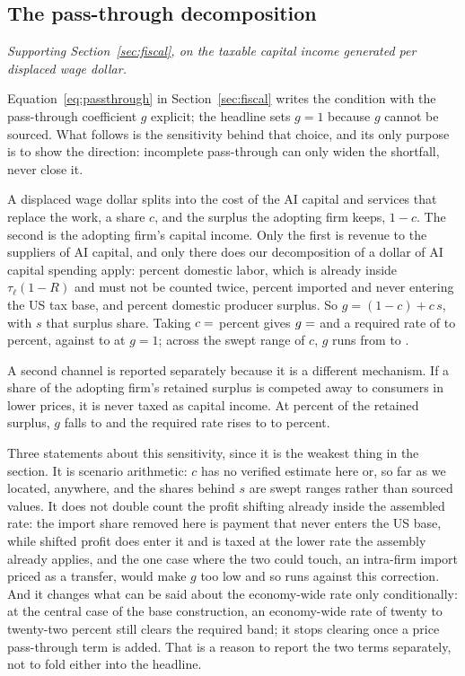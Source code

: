 \subsection{The pass-through decomposition}

\emph{Supporting Section~\ref{sec:fiscal}, on the taxable capital income generated per displaced wage dollar.}

Equation~\eqref{eq:passthrough} in Section~\ref{sec:fiscal} writes the condition with the
pass-through coefficient $g$ explicit; the headline sets $g = 1$ because $g$ cannot be sourced.
What follows is the sensitivity behind that choice, and its only purpose is to show the
direction: incomplete pass-through can only widen the shortfall, never close it.

A displaced wage dollar splits into the cost of the AI capital and services that replace the work,
a share $c$, and the surplus the adopting firm keeps, $1 - c$. The second is the adopting firm's
capital income. Only the first is revenue to the suppliers of AI capital, and only there does our
decomposition of a dollar of AI capital spending apply:  percent
domestic labor, which is already inside $\tau_\ell (1 - R)$ and must not be counted twice,
 percent imported and never entering the US tax base, and
 percent domestic producer surplus. So
$g = (1 - c) + c \, s$, with $s$ that surplus share. Taking $c = \result{CapitalCostShare}$
percent gives $g = \result{GCentral}$ and a required rate of  to
 percent, against  to  at
$g = 1$; across the swept range of $c$, $g$ runs from  to .

A second channel is reported separately because it is a different mechanism. If a share of the
adopting firm's retained surplus is competed away to consumers in lower prices, it is never taxed
as capital income. At  percent of the retained surplus, $g$ falls to
 and the required rate rises to  to
 percent.

Three statements about this sensitivity, since it is the weakest thing in the section. It is
scenario arithmetic: $c$ has no verified estimate here or, so far as we located, anywhere, and the
shares behind $s$ are swept ranges rather than sourced values. It does not double count the
profit shifting already inside the assembled rate: the import share removed here is payment that
never enters the US base, while shifted profit does enter it and is taxed at the lower rate the
assembly already applies, and the one case where the two could touch, an intra-firm import priced
as a transfer, would make $g$ too low and so runs against this correction. And it changes what can
be said about the economy-wide rate only conditionally: at the central case of the base
construction, an economy-wide rate of twenty to twenty-two percent still clears the required band;
it stops clearing once a price pass-through term is added. That is a reason to report the two
terms separately, not to fold either into the headline.

